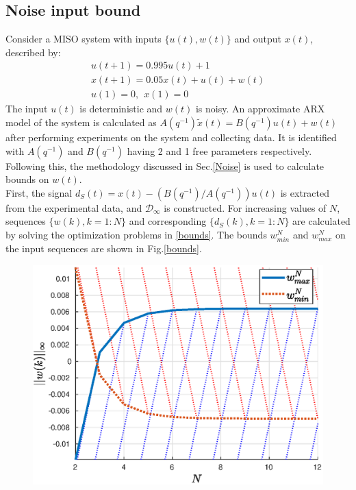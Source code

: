\documentclass[letterpaper, 10 pt, conference]{ieeeconf}  %
\begin{document}
\begin{enumerate}
	\subsection{Noise input bound}
	Consider a MISO system with inputs $\{u(t),w(t)\}$ and output $x(t)$, described by:
	\begin{equation*}
	\begin{matrix}
	u(t+1) = 0.995u(t)+1 \\
	x(t+1) = 0.05x(t)+u(t)+w(t) \\
	u(1) = 0, \hspace{5pt} x(1) = 0
	\end{matrix}
	\end{equation*}
	The input $u(t)$ is deterministic and $w(t)$ is noisy. An approximate ARX model of the system is calculated as $A(q^{-1})\tilde{x}(t) = B(q^{-1})u(t)+w(t)$ after performing experiments on the system and collecting data. It is identified with $A(q^{-1})$ and $B(q^{-1})$ having 2 and 1 free parameters respectively. Following this, the methodology discussed in Sec.\ref{Noise} is used to calculate bounds on $w(t)$.
	\\
	First, the signal $d_S(t)=x(t) - (B(q^{-1})/A(q^{-1}))u(t)$ is extracted from the experimental data, and $\mathcal{D}_{\infty}$ is constructed. For increasing values of $N$, sequences $\{w(k),k=1:N\}$ and corresponding $\{d_S(k),k=1:N\}$ are calculated by solving the optimization problems in \ref{bounds}. The bounds $w^N_{min}$ and $w^N_{max}$ on the input sequences are shown in Fig.\ref{bounds}.
	\begin{figure}[h]
		\includegraphics[scale = 0.65]{bounds.eps}

\end{figure}
\end{enumerate}
\end{document}
